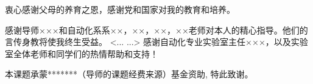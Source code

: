 
\begin{acknowledgements}
  衷心感谢父母的养育之恩，感谢党和国家对我的教育和培养。

  感谢导师×××和自动化系系××，××，××，××老师对本人的精心指导。他们的言传身教将使我终生受益。
  <... ...>
  感谢自动化专业实验室主任×××，以及实验室全体老师和同学们的热情帮助和支持！

  本课题承蒙*******（导师的课题经费来源）基金资助, 特此致谢。
\end{acknowledgements}
